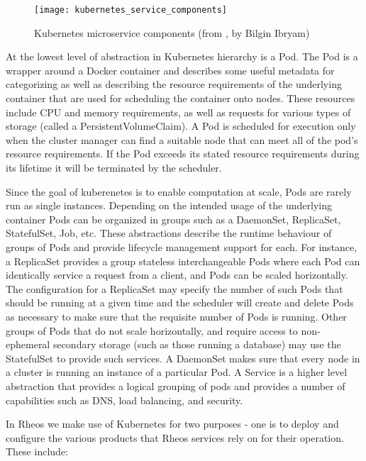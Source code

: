 \begin{figure}[h!]
    \texttt{[image: kubernetes\_service\_components]}
    \centering
    \caption {Kubernetes microservice components (from \autocite{kubernetes_microservice_components}, by Bilgin Ibryam)}
    \label{fig:kubernetes_service_components}
\end{figure}

At the lowest level of abstraction in Kubernetes hierarchy is a Pod. The Pod is a wrapper around a Docker container and describes some useful metadata for categorizing as well as describing the resource requirements of the underlying container that are used for scheduling the container onto nodes. These resources include CPU and memory requirements, as well as requests for various types of storage (called a PersistentVolumeClaim). A Pod is scheduled for execution only when the cluster manager can find a suitable node that can meet all of the pod's resource requirements. If the Pod exceeds its stated resource requirements during its lifetime it will be terminated by the scheduler.

Since the goal of kuberenetes is to enable computation at scale, Pods are rarely run as single instances. Depending on the intended usage of the underlying container Pods can be organized in groups such as a DaemonSet, ReplicaSet, StatefulSet, Job, etc. These abstractions describe the runtime behaviour of groups of Pods and provide lifecycle management support for each. For instance, a ReplicaSet provides a group stateless interchangeable Pods where each Pod can identically service a request from a client, and Pods can be scaled horizontally. The configuration for a ReplicaSet may specify the number of such Pods that should be running at a given time and the scheduler will create and delete Pods as necessary to make sure that the requisite number of Pods is running. Other groups of Pods that do not scale horizontally, and require access to non-ephemeral secondary storage (such as those running a database) may use the StatefulSet to provide such services. A DaemonSet makes sure that every node in a cluster is running an instance of a particular Pod. A Service is a higher level abstraction that provides a logical grouping of pods and provides a number of capabilities such as DNS, load balancing, and security.  

In Rheos we make use of Kubernetes for two purposes - one is to deploy and configure the various products that Rheos services rely on for their operation. These include:

